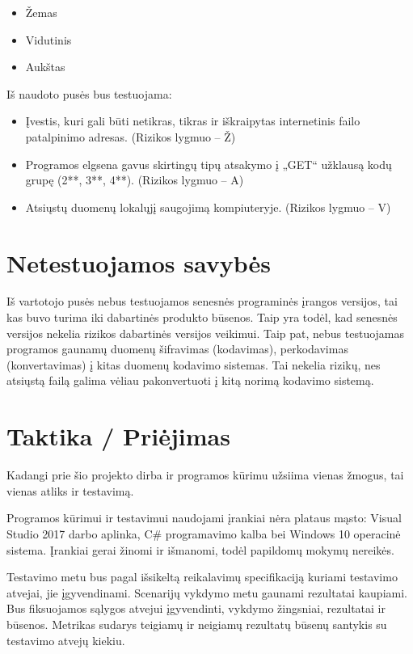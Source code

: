 \begin{itemize}
	\item Žemas
	\item Vidutinis
	\item Aukštas
\end{itemize}

Iš naudoto pusės bus testuojama:

\begin{itemize}
	\item Įvestis, kuri gali būti netikras, tikras ir iškraipytas internetinis failo patalpinimo adresas. (Rizikos lygmuo – Ž)
	\item Programos elgsena gavus skirtingų tipų atsakymo į „GET“ užklausą kodų grupę (2**, 3**, 4**). (Rizikos lygmuo – A)
	\item Atsiųstų duomenų lokalųjį saugojimą kompiuteryje. (Rizikos lygmuo – V)
\end{itemize}

\section{Netestuojamos savybės}

Iš vartotojo pusės nebus testuojamos senesnės programinės įrangos versijos, tai kas buvo turima iki dabartinės produkto būsenos. 
Taip yra todėl, kad senesnės versijos nekelia rizikos dabartinės versijos veikimui. 
Taip pat, nebus testuojamas programos gaunamų duomenų šifravimas (kodavimas), perkodavimas (konvertavimas) į kitas duomenų kodavimo sistemas. 
Tai nekelia rizikų, nes atsiųstą failą galima vėliau pakonvertuoti į kitą norimą kodavimo sistemą.

\section{Taktika / Priėjimas}

Kadangi prie šio projekto dirba ir programos kūrimu užsiima vienas žmogus, tai vienas atliks ir testavimą.

Programos kūrimui ir testavimui naudojami įrankiai nėra plataus mąsto: Visual Studio 2017 darbo aplinka, C\# programavimo kalba bei Windows 10 operacinė sistema. 
Įrankiai gerai žinomi ir išmanomi, todėl papildomų mokymų nereikės. 

Testavimo metu bus pagal išsikeltą reikalavimų specifikaciją kuriami testavimo atvejai, jie įgyvendinami. 
Scenarijų vykdymo metu gaunami rezultatai kaupiami. 
Bus fiksuojamos sąlygos atvejui įgyvendinti, vykdymo žingsniai, rezultatai ir būsenos. 
Metrikas sudarys teigiamų ir neigiamų rezultatų būsenų santykis su testavimo atvejų kiekiu. 

